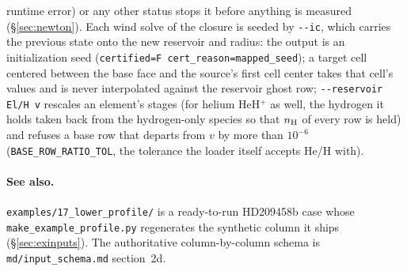 \documentclass[english,a4paper]{my_memo}
\begin{document}
runtime error) or any other status stops it before anything is measured
(\S\ref{sec:newton}). Each wind
solve of the closure is seeded by 
\texttt{-{}-ic}, which carries the previous state onto the new reservoir and
radius: the output is an initialization seed (\texttt{certified=F
cert\_reason=mapped\_seed}); a target cell centered between the base face and
the source's first cell center takes that cell's values and is never
interpolated against the reservoir ghost row; \texttt{-{}-reservoir El/H v}
rescales an element's stages (for helium HeH$^+$ as well, the hydrogen it
holds taken back from the hydrogen-only species so that $n_{\rm H}$ of every
row is held) and refuses a base row that departs from $v$ by
more than $10^{-6}$ (\texttt{BASE\_ROW\_RATIO\_TOL}, the tolerance the loader
itself accepts He/H with).

\paragraph{See also.} \texttt{examples/17\_lower\_profile/} is a ready-to-run
HD209458b case whose \texttt{make\_example\_profile.py} regenerates the
synthetic column it ships (\S\ref{sec:exinputs}). The authoritative
column-by-column schema is \texttt{md/input\_schema.md} section~2d.

\end{document}
